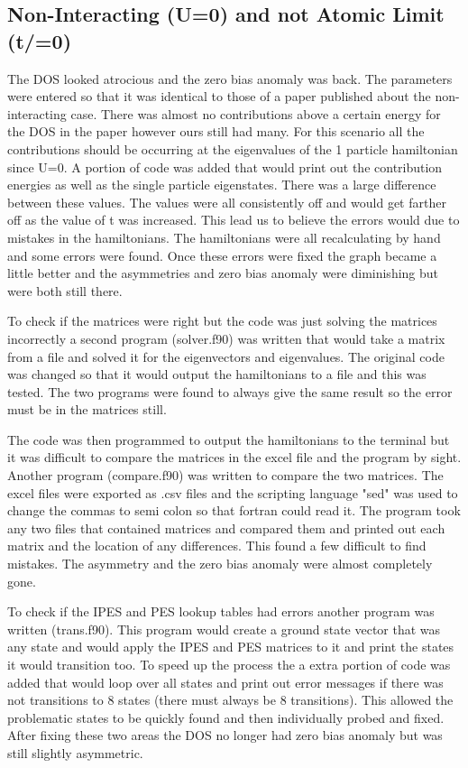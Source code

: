 \documentclass{article}
\begin{document}
\subsection*{Non-Interacting (U=0) and not Atomic Limit (t/=0)}

The DOS looked atrocious and the zero bias anomaly was back. The parameters were entered so that it was identical to those of a paper published about the non-interacting case. There was almost no contributions above a certain energy for the DOS in the paper however ours still had many. For this scenario all the contributions should be occurring at the eigenvalues of the 1 particle hamiltonian since U=0. A portion of code was added that would print out the contribution energies as well as the single particle eigenstates. There was a large difference between these values. The values were all consistently off and would get farther off as the value of t was increased. This lead us to believe the errors would due to mistakes in the hamiltonians. The hamiltonians were all recalculating by hand and some errors were found. Once these errors were fixed the graph became a little better and the asymmetries and zero bias anomaly were diminishing but were both still there. 

To check if the matrices were right but the code was just solving the matrices incorrectly a second program (solver.f90) was written that would take a matrix from a file and solved it for the eigenvectors and eigenvalues.  The original code was changed so that it would output the hamiltonians to a file and this was tested. The two programs were found to always give the same result so the error must be in the matrices still. 

The code was then programmed to output the hamiltonians to the terminal but it was difficult to compare the matrices in the excel file and the program by sight. Another program (compare.f90) was written to compare the two matrices. The excel files were exported as .csv files and the scripting language "sed" was used to change the commas to semi colon so that fortran could read it. The program took any two files that contained matrices and compared them and printed out each matrix and the location of any differences. This found a few difficult to find mistakes. The asymmetry and the zero bias anomaly were almost completely gone.

To check if the IPES and PES lookup tables had errors another program was written (trans.f90). This program would create a ground state vector that was any state and would apply the IPES and PES matrices to it and print the states it would transition too. To speed up the process the a extra portion of code was added that would loop over all states and print out error messages if there was not transitions to 8 states (there must always be 8 transitions). This allowed the problematic states to be quickly found and then individually probed and fixed. After fixing these two areas the DOS no longer had zero bias anomaly but was still slightly asymmetric. 
\end{document}
